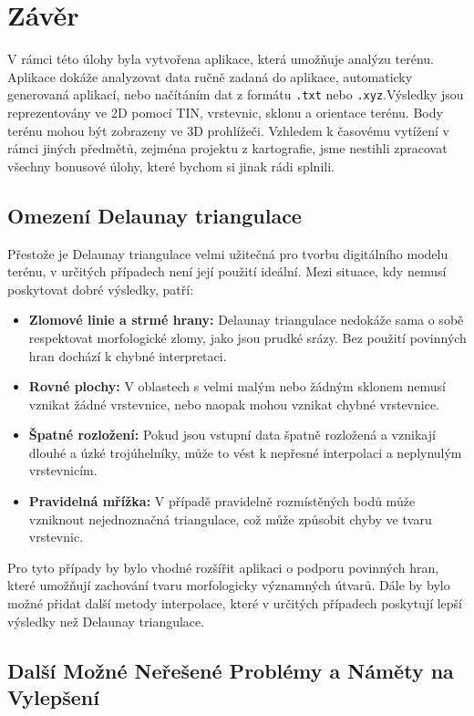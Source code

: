 \section{Závěr}
V rámci této úlohy byla vytvořena aplikace, která umožňuje analýzu terénu. Aplikace dokáže analyzovat data ručně zadaná do aplikace, automaticky generovaná aplikací, nebo načítáním dat z formátu \texttt{.txt} nebo \texttt{.xyz}.Výsledky jsou reprezentovány ve 2D pomocí TIN, vrstevnic, sklonu a orientace terénu. Body terénu mohou být zobrazeny ve 3D prohlížeči.
Vzhledem k časovému vytížení v rámci jiných předmětů, zejména projektu z kartografie, jsme nestihli zpracovat všechny bonusové úlohy, které bychom si jinak rádi splnili.

\subsection{Omezení Delaunay triangulace}

Přestože je Delaunay triangulace velmi užitečná pro tvorbu digitálního modelu terénu, v určitých případech není její použití ideální. Mezi situace, kdy nemusí poskytovat dobré výsledky, patří:
\begin{itemize}
\item \textbf{Zlomové linie a strmé hrany:} Delaunay triangulace nedokáže sama o sobě respektovat morfologické zlomy, jako jsou prudké srázy. Bez použití povinných hran dochází k chybné interpretaci.
\item \textbf{Rovné plochy:} V oblastech s velmi malým nebo žádným sklonem nemusí vznikat žádné vrstevnice, nebo naopak mohou vznikat chybné vrstevnice.
\item \textbf{Špatné rozložení:} Pokud jsou vstupní data špatně rozložená a vznikají dlouhé a úzké trojúhelníky, může to vést k nepřesné interpolaci a neplynulým vrstevnicím.
\item \textbf{Pravidelná mřížka:} V případě pravidelně rozmístěných bodů může vzniknout nejednoznačná triangulace, což může způsobit chyby ve tvaru vrstevnic.
\end{itemize}
Pro tyto případy by bylo vhodné rozšířit aplikaci o podporu povinných hran, které umožňují zachování tvaru morfologicky významných útvarů. Dále by bylo možné přidat další metody interpolace, které v určitých případech poskytují lepší výsledky než Delaunay triangulace.

\subsection{Další Možné Neřešené Problémy a Náměty na Vylepšení}

